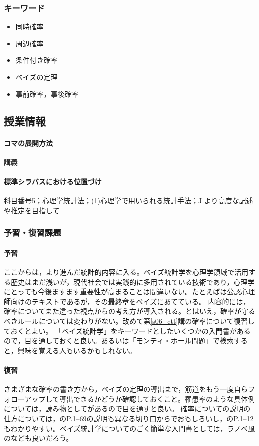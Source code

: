 \subsubsection{キーワード}
\begin{itemize}
	\item 同時確率
	\item 周辺確率
	\item 条件付き確率
	\item ベイズの定理
	\item 事前確率，事後確率
\end{itemize}
\subsection{授業情報}
\paragraph{コマの展開方法}
講義
\paragraph{標準シラバスにおける位置づけ}
科目番号5；心理学統計法；(1)心理学で用いられる統計手法；J より高度な記述や推定を目指して
\subsubsection{予習・復習課題}
\paragraph{予習}
ここからは，より進んだ統計的内容に入る。ベイズ統計学を心理学領域で活用する歴史はまだ浅いが，現代社会では実践的に多用されている技術であり，心理学にとっても今後ますます重要性が高まることは間違いない。たとえば\textcite{Nojima201903}は公認心理師向けのテキストであるが，その最終章をベイズにあてている。
内容的には，確率についてまた違った視点からの考え方が導入される。とはいえ，確率が守るべきルールについては変わりがない。改めて第\ref{s06_ctt}講の確率について復習しておくとよい。
「ベイズ統計学」をキーワードとしたいくつかの入門書があるので，目を通しておくと良い。あるいは「モンティ・ホール問題」で検索すると，興味を覚える人もいるかもしれない。
\paragraph{復習}
さまざまな確率の書き方から，ベイズの定理の導出まで，筋道をもう一度自らフォローアップして導出できるかどうか確認しておくこと。罹患率のような具体例については，読み物として\textcite{Gerd200309}があるので目を通すと良い。
確率についての説明の仕方については，\textcite{Hiraoka200910}のP.1--69の説明も異なる切り口からでおもしろいし，\textcite{Ishida201801}のP.1--12もわかりやすい。ベイズ統計学についてのごく簡単な入門書としては，ラノベ風の\textcite{Ishida201902}なども良いだろう。